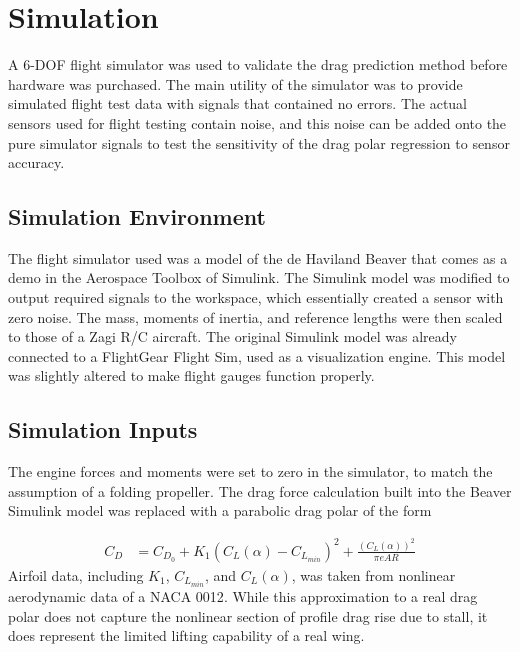 \chapter{Simulation}
\label{simulation}
A 6-DOF flight simulator was used to validate the drag prediction method before hardware was purchased. The main utility of the simulator was to provide simulated flight test data with signals that contained no errors. The actual sensors used for flight testing contain noise, and this noise can be added onto the pure simulator signals to test the sensitivity of the drag polar regression to sensor accuracy.

\section{Simulation Environment}
The flight simulator used was a model of the de Haviland Beaver that comes as a demo in the Aerospace Toolbox of Simulink. The Simulink model was modified to output required signals to the workspace, which essentially created a sensor with zero noise. The mass, moments of inertia, and reference lengths were then scaled to those of a Zagi R/C aircraft\cite{stevens2003aircraft}. The original Simulink model was already connected to a FlightGear Flight Sim, used as a visualization engine. This model was slightly altered to make flight gauges function properly.

\section{Simulation Inputs}
The engine forces and moments were set to zero in the simulator, to match the assumption of a folding propeller. The drag force calculation built into the Beaver Simulink model was replaced with a parabolic drag polar of the form

\begin{align}
C_D &= C_{D_0} + K_1(C_L(\alpha)-C_{L_{min}})^2+\frac{(C_L(\alpha))^2}{\pi eAR}
\end{align}
Airfoil data, including $K_1$, $C_{L_{min}}$, and $C_L(\alpha)$, was taken from nonlinear aerodynamic data of a NACA 0012\cite{osborne2007transitions}. While this approximation to a real drag polar does not capture the nonlinear section of profile drag rise due to stall, it does represent the limited lifting capability of a real wing.


